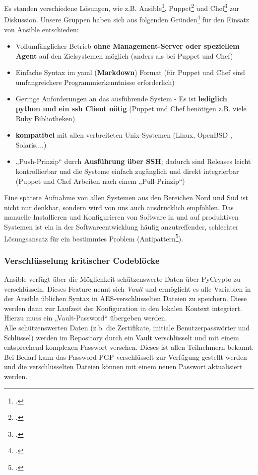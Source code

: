 Es standen verschiedene Lösungen, wie z.B. Ansible\footcite{ansible}, Puppet\footcite{puppet} und Chef\footcite{chef} zur Diskussion. Unsere Gruppen haben sich aus folgenden Gründen\footcite{whyAnsible} für den Einsatz von Ansible entschieden:

\begin{itemize}
\item Vollumfänglicher Betrieb \textbf{ohne Management-Server oder speziellem Agent} auf den Zielsystemen möglich (anders als bei Puppet und Chef)
\item Einfache Syntax im yaml (\textbf{Markdown}) Format
(für Puppet und Chef sind umfangreichere Programmierkenntnisse erforderlich)
\item Geringe Anforderungen an das ausführende System - Es ist \textbf{lediglich python und ein ssh Client nötig} (Puppet und Chef benötigen z.B. viele Ruby Bibliotheken)
\item \textbf{kompatibel} mit allen verbreiteten Unix-Systemen (Linux, OpenBSD , Solaris,...)
\item „Push-Prinzip“ durch \textbf{Ausführung über SSH}; dadurch sind Releases leicht kontrollierbar und die Systeme einfach zugänglich und direkt integrierbar
(Puppet und Chef Arbeiten nach einem „Pull-Prinzip“)
\end{itemize}

Eine spätere Aufnahme von allen Systemen aus den Bereichen Nord und Süd ist nicht nur denkbar, sondern wird von uns auch ausdrücklich empfohlen. Das manuelle Installieren und Konfigurieren von Software in und auf produktiven Systemen ist ein in der Softwareentwicklung häufig anzutreffender, schlechter Lösungsansatz für ein bestimmtes Problem (Antipattern\footcite[S. 5-9]{humble2010continuous}).

\subsubsection{Verschlüsselung kritischer Codeblöcke}
\label{subsubsec:vault}
Ansible verfügt über die Möglichkeit schützenswerte Daten über PyCrypto zu verschlüsseln. Dieses Feature nennt sich \emph{Vault} und ermöglicht es alle Variablen in der Ansible üblichen Syntax in AES-verschlüsselten Dateien zu speichern. Diese werden dann zur Laufzeit der Konfiguration in den lokalen Kontext integriert. Hierzu muss ein „Vault-Password“ übergeben werden. \\

Alle schützenswerten Daten (z.b. die Zertifikate, initiale Benutzerpasswörter und Schlüssel) werden im Repository durch ein Vault verschlüsselt und mit einem entsprechend komplexen Passwort versehen. Dieses ist allen Teilnehmern bekannt. Bei Bedarf kann das Password PGP-verschlüsselt zur Verfügung gestellt werden und die verschlüsselten Dateien können mit einem neuen Passwort aktualisiert werden.

